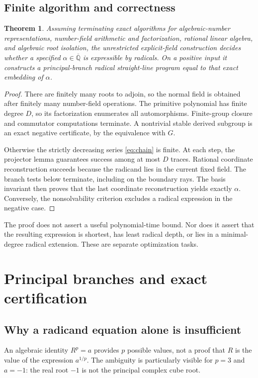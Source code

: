 \documentclass[11pt,letterpaper]{article}
\newtheorem{theorem}{Theorem}[section]
\theoremstyle{definition}\newtheorem{definition}[theorem]{Definition}
\theoremstyle{remark}\newtheorem{remark}[theorem]{Remark}
\newcommand{\Q}{\mathbb Q}\newcommand{\C}{\mathbb C}\newcommand{\Z}{\mathbb Z}
\begin{document}
\subsection{Finite algorithm and correctness}
\begin{theorem}\label{thm:complete}
Assuming terminating exact algorithms for algebraic-number representations,
number-field arithmetic and factorization, rational linear algebra, and
algebraic root isolation, the unrestricted explicit-field construction decides
whether a specified \(\alpha\in\overline{\Q}\) is expressible by radicals.
On a positive input it constructs a principal-branch radical straight-line
program equal to that exact embedding of \(\alpha\).
\end{theorem}
\begin{proof}
There are finitely many roots to adjoin, so the normal field is obtained after
finitely many number-field operations. The primitive polynomial has finite
degree \(D\), so its factorization enumerates all automorphisms. Finite-group
closure and commutator computations terminate. A nontrivial stable derived
subgroup is an exact negative certificate, by the equivalence with \(G\).

Otherwise the strictly decreasing series \eqref{eq:chain} is finite.
At each step, the projector lemma guarantees success among at most \(D\)
traces. Rational coordinate reconstruction succeeds because the radicand lies
in the current fixed field. The branch tests below terminate, including on
the boundary rays. The basis invariant then proves that the last coordinate
reconstruction yields exactly \(\alpha\). Conversely, the nonsolvability
criterion excludes a radical expression in the negative case.
\end{proof}
The proof does not assert a useful polynomial-time bound. Nor does it assert
that the resulting expression is shortest, has least radical depth, or lies
in a minimal-degree radical extension. These are separate optimization tasks.

\section{Principal branches and exact certification}
\label{sec:branches}
\subsection{Why a radicand equation alone is insufficient}
An algebraic identity \(R^p=a\) provides \(p\) possible values, not a proof
that \(R\) is the value of the expression \(a^{1/p}\). The ambiguity is
particularly visible for \(p=3\) and \(a=-1\): the real root \(-1\) is
not the principal complex cube root.
\end{document}

